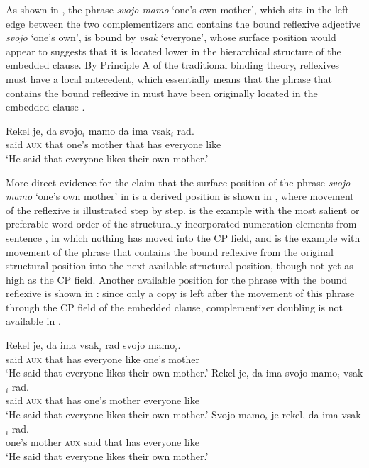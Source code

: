 \documentclass[output=paper,
]{langscibook}
\begin{document}
As shown in , the phrase \textit{svojo mamo} `one’s own mother', which sits in the left edge between the two complementizers and contains the bound reflexive adjective \textit{svojo} `one’s own', is bound by \textit{vsak} `everyone', whose surface position would appear to suggests that it is located lower in the hierarchical structure of the embedded clause. By Principle A of the traditional binding theory, reflexives must have a local antecedent, which essentially means that the phrase that contains the bound reflexive in  must have been originally located in the embedded clause \citep{chomsky1981}.

\begin{exe} 
\ex \label{ex:plesnicar:four}
\gll Rekel	je,	da	svojo$_i$	mamo		da	ima	vsak$_i$		rad. \\
	said	\textsc{aux}	that	one’s	mother		that	has	everyone	like\\
\trans `He said that everyone likes their own mother.' 
\end{exe}

\noindent More direct evidence for the claim that the surface position of the phrase \textit{svojo mamo} `one’s own mother' in  is a derived position is shown in , where movement of the reflexive is illustrated step by step.  is the example with the most salient or preferable word order of the structurally incorporated numeration elements from sentence , in which nothing has moved into the CP field, and  is the example with movement of the phrase that contains the bound reflexive from the original structural position into the next available structural position, though not yet as high as the CP field. Another available position for the phrase with the bound reflexive is shown in  : since only a copy is left after the movement of this phrase through the CP field of the embedded clause, complementizer doubling is not available in .

\begin{exe} 
\ex \begin{xlist} \label{ex:plesnicar:five}
\ex \label{ex:plesnicar:fivea}\gll Rekel	je,	da	ima	vsak$_i$		rad	svojo	mamo$_i$.\\
	said	\textsc{aux}	that	has	everyone	like	one’s mother \\
\trans `He said that everyone likes their own mother.'
\ex \label{ex:plesnicar:fiveb}
\gll	Rekel	je,	da	ima	svojo	mamo$_i$	vsak$_i$		rad. 	\\
	said	\textsc{aux} that	has	one’s	mother	everyone	like \\
\trans `He said that everyone likes their own mother.'
\ex \label{ex:plesnicar:fivec}
\gll	Svojo	mamo$_i$	je	rekel,	da	ima	vsak$_i$		rad. 	\\
	one’s	mother	\textsc{aux} 	said	that	has	everyone	like \\
\trans `He said that everyone likes their own mother.'
\end{xlist}\end{exe}
\end{document}
